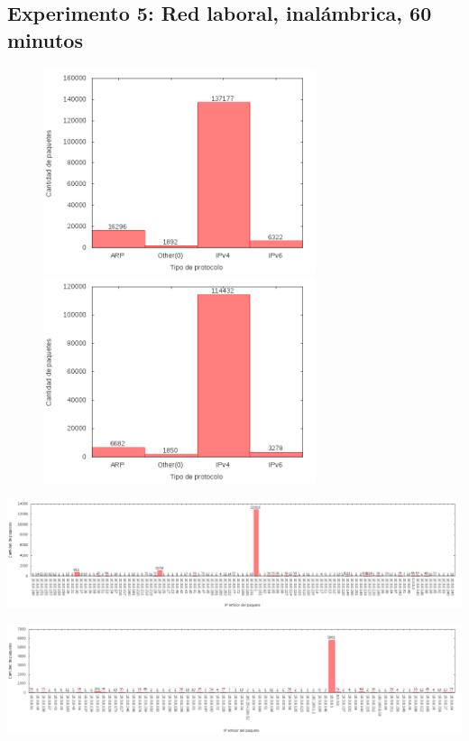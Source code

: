 \subsection{Experimento 5: Red laboral, inalámbrica, 60 minutos}

\begin{figure}[!h]
\centering
\begin{minipage}{8cm}
  \centering
  \includegraphics[width=8cm]{../mediciones/job1/type.png}
\end{minipage}%
\begin{minipage}{8cm}
  \centering
  \includegraphics[width=8cm]{../mediciones/job2/type.png}
\end{minipage}
\end{figure}

\begin{center}
\includegraphics[width=16cm]{../mediciones/job1/src.png}
\end{center}

\begin{center}
\includegraphics[width=16cm]{../mediciones/job2/src.png}
\end{center}

